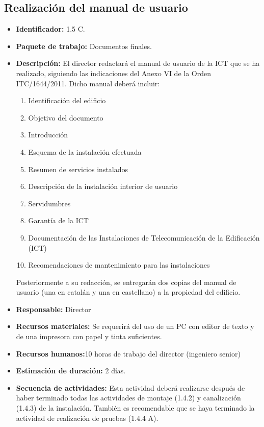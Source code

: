 \subsection{Realización del manual de usuario}
\begin{itemize}
\item \textbf{Identificador: }1.5 C.
\item \textbf{Paquete de trabajo: }Documentos finales.
\item \textbf{Descripción: }El director redactará el manual de usuario de la ICT que se ha realizado, siguiendo las indicaciones del Anexo VI de la Orden ITC/1644/2011. Dicho manual deberá incluir:
\begin{enumerate}
\item Identificación del edificio
\item Objetivo del documento
\item Introducción
\item Esquema de la instalación efectuada
\item Resumen de servicios instalados
\item Descripción de la instalación interior de usuario
\item Servidumbres
\item Garantía de la ICT
\item Documentación de las Instalaciones de Telecomunicación de la Edificación (ICT)
\item Recomendaciones de mantenimiento para las instalaciones
\end{enumerate}
Posteriormente a su redacción, se entregarán dos copias del manual de usuario (una en catalán y una en castellano) a la propiedad del edificio.
\item \textbf{Responsable: }Director
\item \textbf{Recursos materiales: }Se requerirá del uso de un PC con editor de texto y de una impresora con papel y tinta suficientes.
\item \textbf{Recursos humanos:}10 horas de trabajo del director (ingeniero senior)
\item \textbf{Estimación de duración: }2 días.
\item \textbf{Secuencia de actividades: }Esta actividad deberá realizarse después de haber terminado todas las actividades de montaje (1.4.2) y canalización (1.4.3) de la instalación. También es recomendable que se haya terminado la actividad de realización de pruebas (1.4.4 A).
\end{itemize}


